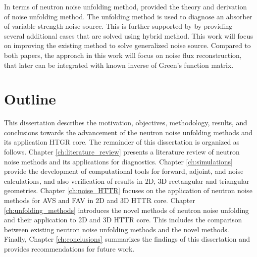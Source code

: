 In terms of neutron noise unfolding method, \cite{demaziereIdentificationLocalizationAbsorbers2005} provided the theory and derivation of noise unfolding method. The unfolding method is used to diagnose an absorber of variable strength noise source. This is further supported by \cite{hosseiniNoiseSourceReconstruction2014} by providing several additional cases that are solved using hybrid method. This work will focus on improving the existing method to solve generalized noise source. Compared to both papers, the approach in this work will focus on noise flux reconstruction, that later can be integrated with known inverse of Green’s function matrix.

\section{Outline}

This dissertation describes the motivation, objectives, methodology, results, and conclusions towards the advancement of the neutron noise unfolding methods and its application HTGR core.
The remainder of this dissertation is organized as follows.
Chapter \ref{ch:literature_review} presents a literature review of neutron noise methods and its applications for diagnostics.
Chapter \ref{ch:simulations} provide the development of computational tools for forward, adjoint, and noise calculations, and also verification of results in 2D, 3D rectangular and triangular geometries.
Chapter \ref{ch:noise_HTTR} focuses on the application of neutron noise methods for AVS and FAV in 2D and 3D HTTR core.
Chapter \ref{ch:unfolding_methods} introduces the novel methods of neutron noise unfolding and their application to 2D and 3D HTTR core. This includes the comparison between existing neutron noise unfolding methods and the novel methods.
Finally, Chapter \ref{ch:conclusions} summarizes the findings of this dissertation and provides recommendations for future work.

% 
% 
% 
% 
